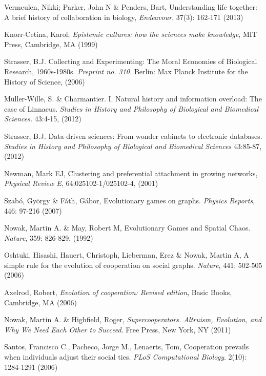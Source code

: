 \begin{thebibliography}{50}

 Vermeulen, Nikki; Parker, John N \& Penders, Bart, Understanding life together: A brief history of collaboration in biology, \textit{Endeavour}, 37(3): 162-171 (2013)

 Knorr-Cetina, Karol; \textit{Epistemic cultures: how the sciences make knowledge}, MIT Press, Cambridge, MA (1999)

 Strasser, B.J. Collecting and Experimenting: The Moral Economies of Biological Research, 1960s-1980s. \textit{Preprint no. 310.} Berlin: Max Planck Institute for the History of Science, (2006)

 M\"{u}ller-Wille, S. \& Charmantier. I.  Natural history and information overload: The case of Linnaeus. \textit{Studies in History and Philosophy of Biological and Biomedical Sciences.} 43:4-15, (2012)

 Strasser, B.J. Data-driven sciences: From wonder cabinets to electronic databases. \textit{Studies in History and Philosophy of Biological and Biomedical Sciences} 43:85-87, (2012)

 Newman, Mark EJ, Clustering and preferential attachment in growing networks, \textit{Physical Review E}, 64:025102-1/025102-4, (2001)



 Szab\'o, Gy\"{o}rgy \& F\'ath, G\'abor, Evolutionary games on graphs. \textit{Physics Reports}, 446: 97-216 (2007)

 Nowak, Martin A. \& May, Robert M, Evolutionary
  Games and Spatial Chaos. \textit{Nature}, 359: 826-829, (1992)

 Oshtuki, Hisashi, Hauert, Christoph, Lieberman, Erez \& Nowak, Martin A, A simple rule for the evolution of cooperation on social graphs. \textit{Nature}, 441: 502-505 (2006)

 Axelrod, Robert, \textit{Evolution of cooperation: Revised edition}, Basic Books, Cambridge, MA (2006)

 Nowak, Martin A. \& Highfield, Roger,
  \textit{Supercooperators. Altruism, Evolution, and Why We Need Each
    Other to Succeed}. Free Press, New York, NY  (2011)

 Santos, Francisco C., Pacheco, Jorge M., Lenaerts, Tom, Cooperation prevails when individuals adjust their social ties. \textit{PLoS Computational Biology}. 2(10): 1284-1291 (2006)


\end{thebibliography}
